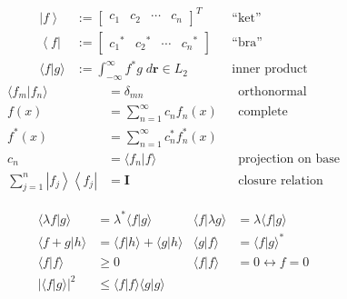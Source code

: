 \noindent\begin{align*}
    \left|f\right\rangle  & := \begin{bmatrix}
                                   c_1 & c_2 & \cdots & c_n
                               \end{bmatrix}^T                               &  & \text{``ket''}              \\
    \left\langle f\right| & := \begin{bmatrix}
                                   {c_1}^* & {c_2}^* & \cdots & {c_n}^*
                               \end{bmatrix}                   &  & \text{``bra''}                            \\
    \langle f|g \rangle   & := \int_{-\infty}^{\infty} f^* g\; d \mathbf{r} \in L_2 &  & \text{inner product}
\end{align*}
\noindent\begin{align*}
    \langle f_m|f_n \rangle                                       & = \delta_{mn}                        &  & \text{orthonormal}        \\
    f(x)                                                          & = \sum_{n=1}^{\infty} c_n f_n(x)     &  & \text{complete}           \\
    f^*(x)                                                        & = \sum_{n=1}^{\infty} c_n^* f_n^*(x) &  &                           \\
    c_n                                                           & = \langle f_n|f \rangle              &  & \text{projection on base} \\
    \sum_{j=1}^{n} \left|f_j\right\rangle \left\langle f_j\right| & = \mathbf{I}                         &  & \text{closure relation}
\end{align*}

\noindent\begin{align*}
    \langle \lambda f|g \rangle & =\lambda^* \langle f|g \rangle               & \langle f|\lambda g \rangle & =\lambda \langle f|g \rangle \\
    \langle f+g|h \rangle       & =\langle f|h \rangle + \langle g|h \rangle   & \langle g|f \rangle         & = {\langle f|g \rangle}^*    \\
    \langle f|f \rangle         & \ge 0                                        & \langle f|f \rangle         & = 0 \leftrightarrow f=0      \\
    |\langle f|g \rangle |^2    & \leq \langle f|f \rangle \langle g|g \rangle
\end{align*}

